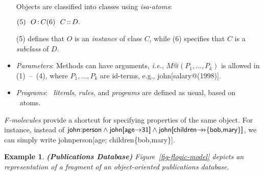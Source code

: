 \documentclass[11pt]{report}
\newtheorem{example}{Example}[section]
\begin{document}
\begin{itemize}
  Objects are classified into classes using
  \emph{isa-atoms}: \medskip

  \begin{math}
    \hfill (5)~~O\isa C \hfill (6)~~C\subcl D. \hfill
  \end{math} \medskip

  (5) defines that $O$ is an \emph{instance} of class $C$, while (6)
  specifies that $C$ is a \emph{subclass} of $D$. 
\item \emph{Parameters}: Methods can have arguments, {\it i.e.}, 
  \begin{math}
    M@(P_1,\dots,P_k)
  \end{math}
  is allowed in (1)~--~(4), where $P_1,\dots,P_k$ are
  id-terms, e.g., \textsf{john[salary@(1998)]}.
  
\item \emph{Programs}: \fl\ \emph{literals}, \emph{rules}, and
  \emph{programs} are defined as usual, based on \fl\ atoms.
\end{itemize}

\noindent
\emph{F-molecules} provide a shortcut for specifying properties of the same
object. For instance, instead of
$\textsf{john:person}\land\textsf{john[age\ensuremath{{\rightarrow}}31]}\land\textsf{john[children\ensuremath{{\rightarrow\!\!\!\!\rightarrow}}\{bob,mary\}]}$, we can simply write
\textsf{john\isa person[age; children\mvd\{bob,mary\}]}.


\begin{example}
  {\bf (Publications Database)} \rm Figure~\ref{fig-flogic-model} depicts
  an \fl representation of a fragment of an object-oriented publications
  database.
\end{example}
\end{document}
